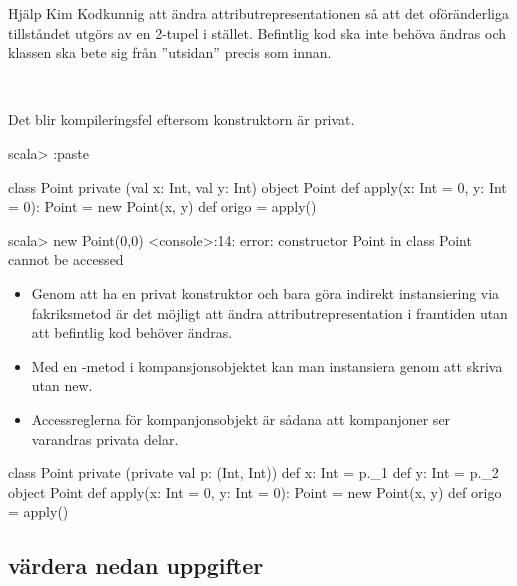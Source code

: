 \Subtask Hjälp Kim Kodkunnig att ändra attributrepresentationen så att det oföränderliga tillståndet utgörs av en 2-tupel  i stället. Befintlig kod ska inte behöva ändras och klassen  ska bete sig från ''utsidan'' precis som innan.

\SOLUTION

\TaskSolved \what~

\SubtaskSolved Det blir kompileringsfel eftersom konstruktorn är privat.
\begin{REPL}
scala> :paste

class Point private (val x: Int, val y: Int)
object Point {
  def apply(x: Int = 0, y: Int = 0): Point = new Point(x, y)
  def origo = apply()
}

scala> new Point(0,0)
<console>:14: error: constructor Point in class Point cannot be accessed
\end{REPL}

\SubtaskSolved
\begin{itemize}
  \item Genom att ha en privat konstruktor och bara göra indirekt instansiering via fakriksmetod är det möjligt att ändra attributrepresentation i framtiden utan att befintlig kod behöver ändras.

  \item Med en -metod i kompansjonsobjektet kan man instansiera genom att skriva  utan new.

  \item Accessreglerna för kompanjonsobjekt är sådana att kompanjoner ser varandras privata delar.
\end{itemize}

\SubtaskSolved

\begin{Code}
class Point private (private val p: (Int, Int)) {
  def x: Int = p._1
  def y: Int = p._2
}
object Point {
  def apply(x: Int = 0, y: Int = 0): Point = new Point(x, y)
  def origo = apply()
}
\end{Code}

\QUESTEND


\subsection{\TODO värdera nedan uppgifter}



\QUESTBEGIN

